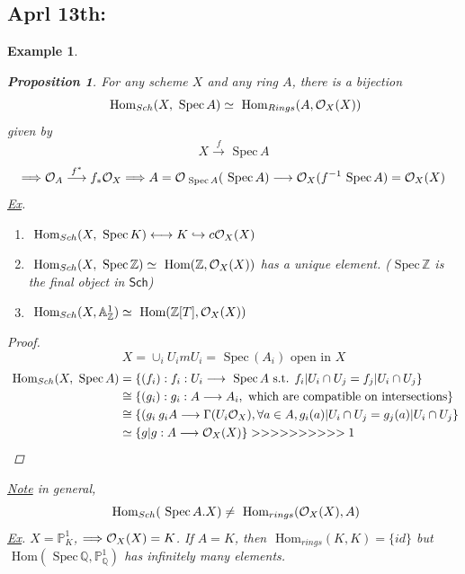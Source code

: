 \documentclass[11pt]{article}
\newtheorem{prop}[thm]{Proposition}
\newtheorem{ex}[thm]{Example}
\renewcommand{\hom}{\text{ Hom}}
\newcommand{\spec}{\text{ Spec}\,}
\newcommand{\affn}{\mathbb A}
\newcommand{\proj}{\mathbb P}
\newcommand{\intg}{\mathbb Z}
\newcommand{\ratl}{\mathbb Q}
\newcommand{\calo}{{\cal O}}
\newcommand{\Lrta}{\Longrightarrow}
\newcommand{\lrta}{\longrightarrow}
\newcommand{\llrta}{\longleftrightarrow}
\newcommand{\inj}{\hookrightarrow}
\begin{document}
\subsection{Aprl 13th: }
\begin{ex}
\begin{prop}
For any scheme $X$ and any ring $A$, there is a bijection
$$
\hom_{Sch}(X,\spec A)\simeq \hom_{Rings}(A,\calo_X(X))
$$
given by 
$$
X\overset{f}{\lrta}\spec A
$$
$$
\Lrta \calo_A\overset{f^*}{\lrta} f_*\calo_X\Lrta A=\calo_{\spec A}(\spec A)\lrta \calo_X(f^{-1}\spec A)=\calo_X(X)
$$
\underline{Ex}.\begin{enumerate}[label=(\arabic*)]
\item $\hom_{Sch}(X,\spec K)\llrta K\inj c\calo_X(X)$
\item $\hom_{Sch}(X,\spec \intg)\simeq \hom(\intg,\calo_X(X))$ has a unique element. ($\spec \intg$ is the final object in $\mathsf{Sch}$) 
\item $\hom_{Sch}(X,\affn^1_\intg)\simeq\hom(\intg[T],\calo_X(X))$
\end{enumerate}
\end{prop}
\begin{proof}
$$
X=\cup_i U_im U_i=\spec(A_i)\text{ open in } X
$$
$$
\begin{aligned}
\hom_{Sch}(X,\spec A)&=\{(f_i):f_i:U_i\lrta \spec A\text{ s.t. }f_i|U_i\cap U_j=f_j|U_i\cap U_j\}\\
&\cong\{(g_i):g_i:A\lrta A_i,\text{ which are compatible on intersections} \}\\
&\cong\{(g_i\: g_iA\lrta \Gamma(U_i\calo_X),\forall a\in A, g_i(a)|U_i\cap U_j=g_j(a)|U_i\cap U_j\}\\
&\simeq\{g|g:A\lrta \calo_X(X)\}
>>>>>>>>>>1
\end{aligned}
$$
\end{proof}
\underline{Note} in general, 
$$
\hom_{Sch}(\spec A. X)\neq \hom_{rings}(\calo_X(X),A)
$$
\underline{Ex}. $X=\proj^1_K$, $\Lrta \calo_X(X)=K$. If $A=K$, then $\hom_{rings}(K,K)=\{id\}$ but 
$\hom(\spec \ratl,\proj^1_\ratl)$ has infinitely many elements.
\end{ex}
\end{document}
